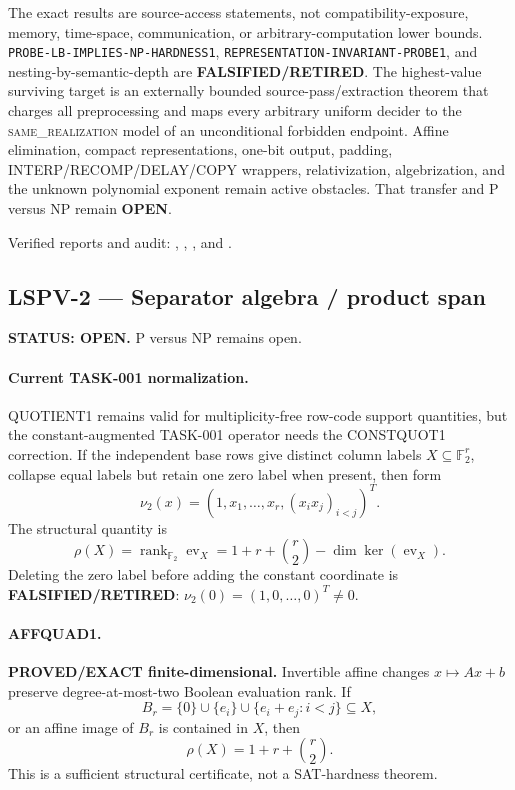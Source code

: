 \documentclass[11pt]{article}
\begin{document}
The exact results are source-access statements, not compatibility-exposure,
memory, time-space, communication, or arbitrary-computation lower bounds.
\texttt{PROBE-LB-IMPLIES-NP-HARDNESS1},
\texttt{REPRESENTATION-INVARIANT-PROBE1}, and nesting-by-semantic-depth are
\textbf{FALSIFIED/RETIRED}.  The highest-value surviving target is an
externally bounded source-pass/extraction theorem that charges all
preprocessing and maps every arbitrary uniform decider to the
\textsc{same\_realization} model of an unconditional forbidden endpoint.
Affine elimination, compact representations, one-bit output, padding,
INTERP/RECOMP/DELAY/COPY wrappers, relativization, algebrization, and the
unknown polynomial exponent remain active obstacles.  That transfer and
P versus NP remain \textbf{OPEN}.

Verified reports and audit:
,
,
, and
.

\subsection{LSPV-2 --- Separator algebra / product span}
\textbf{STATUS: OPEN.} P versus NP remains open.

\paragraph{Current TASK-001 normalization.}
QUOTIENT1 remains valid for multiplicity-free row-code support quantities, but the constant-augmented TASK-001 operator needs the CONSTQUOT1 correction.  If the independent base rows give distinct column labels \(X\subseteq\mathbb F_2^r\), collapse equal labels but retain one zero label when present, then form
\[
 \nu_2(x)=\left(1,x_1,\ldots,x_r,(x_ix_j)_{i<j}\right)^T.
\]
The structural quantity is
\[
 \rho(X)=\operatorname{rank}_{\mathbb F_2}\operatorname{ev}_X
 =1+r+\binom r2-\dim\ker(\operatorname{ev}_X).
\]
Deleting the zero label before adding the constant coordinate is \textbf{FALSIFIED/RETIRED}: \(\nu_2(0)=(1,0,\ldots,0)^T\neq0\).

\paragraph{AFFQUAD1.}
\textbf{PROVED/EXACT finite-dimensional.}  Invertible affine changes \(x\mapsto Ax+b\) preserve degree-at-most-two Boolean evaluation rank.  If
\[
 B_r=\{0\}\cup\{e_i\}\cup\{e_i+e_j:i<j\}\subseteq X,
\]
or an affine image of \(B_r\) is contained in \(X\), then
\[
 \rho(X)=1+r+\binom r2.
\]
This is a sufficient structural certificate, not a SAT-hardness theorem.
\end{document}
